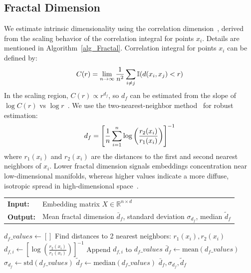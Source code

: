 \documentclass[]{Liebert_Author_revised}
\begin{document}
\subsection{Fractal Dimension}

We estimate intrinsic dimensionality using the correlation dimension~\citeauthor{grassberger1983measuring}, derived from the scaling behavior of the correlation integral for points ${x_i}$. Details are mentioned in Algorithm~\ref{alg_Fractal}.  Correlation integral for points ${x_i}$ can be defined by:
\begin{equation}
\scriptsize
C(r) = \lim_{n \to \infty} \frac{1}{n^2} \sum_{i \neq j} \mathbb{I}(d(x_i, x_j) < r)
\end{equation}
In the scaling region, $C(r) \propto r^{d_f}$, so $d_f$ can be estimated from the slope of $\log C(r)$ vs $\log r$~\citeauthor{camastra2016intrinsic}. We use the two-nearest-neighbor method~\citeauthor{facco2017estimating} for robust estimation:
\begin{equation}
\scriptsize
d_f = \left[ \frac{1}{n} \sum_{i=1}^n \log\left(\frac{r_2(x_i)}{r_1(x_i)}\right) \right]^{-1}
\end{equation}
where $r_1(x_i)$ and $r_2(x_i)$ are the distances to the first and second nearest neighbors of $x_i$. Lower fractal dimension signals embeddings concentration near low-dimensional manifolds, whereas higher values indicate a more diffuse, isotropic spread in high-dimensional space~\citeauthor{levina2004maximum}.


\begin{algorithm}[h!]
\caption{Estimate Fractal Dimension}
\label{alg_Fractal}
\small
\noindent
\begin{tabular}{p{1cm}p{7cm}}
\textbf{Input:}  & Embedding matrix $X \in \mathbb{R}^{n \times d}$ \\
\textbf{Output:} & Mean fractal dimension $\bar{d}_f$, standard deviation $\sigma_{d_f}$, median $\tilde{d}_f$
\end{tabular}
\begin{algorithmic}[1]
\STATE $d_f\_values \leftarrow []$
    \STATE Find distances to 2 nearest neighbors: $r_1(x_i), r_2(x_i)$
    \STATE $d_{f,i} \leftarrow \left[\log\left(\frac{r_2(x_i)}{r_1(x_i)}\right)\right]^{-1}$
    \STATE Append $d_{f,i}$ to $d_f\_values$
\ENDFOR
\STATE $\bar{d}_f \leftarrow \text{mean}(d_f\_values)$
\STATE $\sigma_{d_f} \leftarrow \text{std}(d_f\_values)$
\STATE $\tilde{d}_f \leftarrow \text{median}(d_f\_values)$
\RETURN $\bar{d}_f, \sigma_{d_f}, \tilde{d}_f$
\end{algorithmic}
\end{algorithm}
\end{document}
